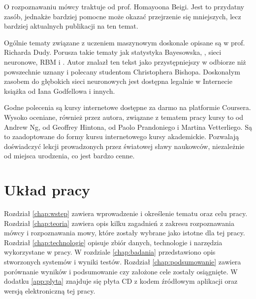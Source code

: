 O rozpoznawaniu mówcy traktuje  od prof. Homayoona Beigi.
Jest to przydatny zasób, jednakże bardziej pomocne może okazać przejrzenie się mniejszych, lecz
bardziej aktualnych publikacji na ten temat.

Ogólnie tematy związane z uczeniem maszynowym doskonale opisane są w
\cite{patternClassification} prof. Richarda Dudy.
Porusza takie tematy jak statystyka Bayesowska, , sieci neuronowe, RBM
i . Autor znalazł ten tekst jako przystępniejszy w odbiorze niż powszechnie
uznany i polecany studentom  Christophera Bishopa.
Doskonałym zasobem do głębokich sieci neuronowych jest dostępna legalnie w Internecie książka
\cite{deeplearningbook} od Iana Godfellowa i innych.

Godne polecenia są kursy internetowe dostępne za darmo na platformie Coursera.
Wysoko oceniane, również przez autora, związane z tematem pracy kursy to
 od Andrew Ng,
 od Geoffrey Hintona,
 od Paolo Prandoniego i  Martina Vetterliego.
Są to zaadoptowane do formy kursu internetowego kursy akademickie. Pozwalają
doświadczyć lekcji prowadzonych przez światowej sławy naukowców, niezależnie
od miejsca urodzenia, co jest bardzo cenne.

\section{Układ pracy}\label{sec:uklad_pracy}

Rozdział \ref{chap:wstep} zawiera wprowadzenie i określenie tematu oraz celu
pracy. Rozdział \ref{chap:teoria} zawiera opis kilku zagadnień z zakresu
rozpoznawania mówcy i rozpoznawania mowy, które zostały wybrane jako
istotne dla tej pracy. Rozdział \ref{chap:technologie}
opisuje zbiór danych, technologie i narzędzia wykorzystane w pracy. W rozdziale
\ref{chap:badania} przedstawiono opis stworzonych systemów i wyniki testów. Rozdział
\ref{chap:podsumowanie} zawiera porównanie wyników i podsumowanie czy założone
cele zostały osiągnięte. W dodatku \ref{app:plyta} znajduje się płyta CD z
kodem źródłowym aplikacji oraz wersją elektroniczną tej pracy.

